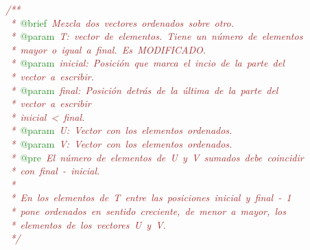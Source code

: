 \mbox{}\textit{\textcolor{Brown}{/**}} \\
\mbox{}\textit{\textcolor{Brown}{\ *\ }}\textcolor{ForestGreen}{@brief}\textit{\textcolor{Brown}{\ Mezcla\ dos\ vectores\ ordenados\ sobre\ otro.}} \\
\mbox{}\textit{\textcolor{Brown}{\ *\ }}\textcolor{ForestGreen}{@param}\textit{\textcolor{Brown}{\ T:\ vector\ de\ elementos.\ Tiene\ un\ número\ de\ elementos\ }} \\
\mbox{}\textit{\textcolor{Brown}{\ *\ mayor\ o\ igual\ a\ final.\ Es\ MODIFICADO.}} \\
\mbox{}\textit{\textcolor{Brown}{\ *\ }}\textcolor{ForestGreen}{@param}\textit{\textcolor{Brown}{\ inicial:\ Posición\ que\ marca\ el\ incio\ de\ la\ parte\ del}} \\
\mbox{}\textit{\textcolor{Brown}{\ *\ vector\ a\ escribir.}} \\
\mbox{}\textit{\textcolor{Brown}{\ *\ }}\textcolor{ForestGreen}{@param}\textit{\textcolor{Brown}{\ final:\ Posición\ detrás\ de\ la\ última\ de\ la\ parte\ del}} \\
\mbox{}\textit{\textcolor{Brown}{\ *\ vector\ a\ escribir}} \\
\mbox{}\textit{\textcolor{Brown}{\ *\ inicial\ \textless{}\ final.}} \\
\mbox{}\textit{\textcolor{Brown}{\ *\ }}\textcolor{ForestGreen}{@param}\textit{\textcolor{Brown}{\ U:\ Vector\ con\ los\ elementos\ ordenados.}} \\
\mbox{}\textit{\textcolor{Brown}{\ *\ }}\textcolor{ForestGreen}{@param}\textit{\textcolor{Brown}{\ V:\ Vector\ con\ los\ elementos\ ordenados.}} \\
\mbox{}\textit{\textcolor{Brown}{\ *\ }}\textcolor{ForestGreen}{@pre}\textit{\textcolor{Brown}{\ El\ número\ de\ elementos\ de\ U\ y\ V\ sumados\ debe\ coincidir}} \\
\mbox{}\textit{\textcolor{Brown}{\ *\ con\ final\ -\ inicial.}} \\
\mbox{}\textit{\textcolor{Brown}{\ *\ }} \\
\mbox{}\textit{\textcolor{Brown}{\ *\ En\ los\ elementos\ de\ T\ entre\ las\ posiciones\ inicial\ y\ final\ -\ 1}} \\
\mbox{}\textit{\textcolor{Brown}{\ *\ pone\ ordenados\ en\ sentido\ creciente,\ de\ menor\ a\ mayor,\ los}} \\
\mbox{}\textit{\textcolor{Brown}{\ *\ elementos\ de\ los\ vectores\ U\ y\ V.}} \\
\mbox{}\textit{\textcolor{Brown}{\ */}} \\
